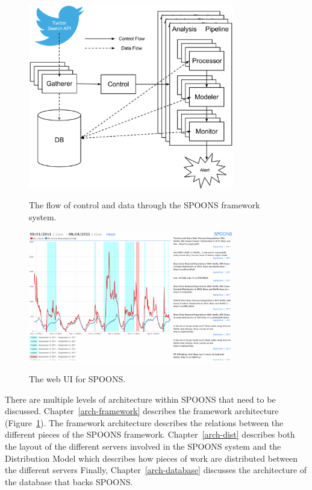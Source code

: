 \documentclass[12pt]{ucthesis}
\newcommand{\captionfonts}{\small\bf\ssp}
\begin{document}
\begin{figure}
   \begin{center}
      \includegraphics[width=0.8\textwidth]{images/SPOONS_Framework_Architecture.eps}
      \captionfonts
      \caption[SPOONS Framework Architecture]{The flow of control and data through the SPOONS framework system.}
      \label{fig:frameworkArch}
   \end{center}
\end{figure}

\begin{figure}
   \begin{center}
      \includegraphics[width=0.8\textwidth]{images/ui.eps}
      \captionfonts
      \caption[SPOONS UI]{The web UI for SPOONS.}
      \label{fig:ui}
   \end{center}
\end{figure}

There are multiple levels of architecture within SPOONS that need to be discussed.
Chapter~\ref{arch-framework} describes the framework architecture (Figure~\ref{fig:frameworkArch}).
The framework architecture describes the relations between the different pieces of the SPOONS framework.
Chapter~\ref{arch-dist} describes both the layout of the different servers involved in the SPOONS system
and the Distribution Model which describes how pieces of work are distributed between the different servers
Finally, Chapter~\ref{arch-database} discusses the architecture of the database that backs SPOONS.
\end{document}
